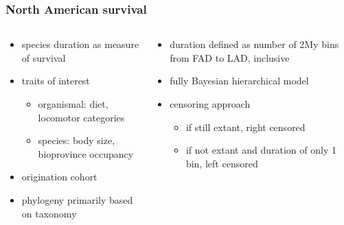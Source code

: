 \documentclass{beamer}
\begin{document}
\begin{frame}
  \frametitle{North American survival}
  \begin{columns}
    \begin{column}{0.5\textwidth}
      \begin{itemize}
        \item species duration as measure of survival
        \item traits of interest
          \begin{itemize}
            \item organismal: diet, locomotor categories
            \item species: body size, bioprovince occupancy
          \end{itemize}
        \item origination cohort
        \item phylogeny primarily based on taxonomy
      \end{itemize}
    \end{column}
    \begin{column}{0.5\textwidth}
      \begin{itemize}
        \item duration defined as number of 2My bins from FAD to LAD, inclusive
        \item fully Bayesian hierarchical model
        \item censoring approach
          \begin{itemize}
            \item if still extant, right censored
            \item if not extant and duration of only 1 bin, left censored
          \end{itemize}
      \end{itemize}
    \end{column}
  \end{columns}
\end{frame}
\end{document}
